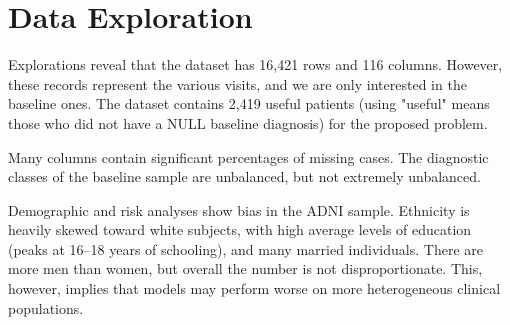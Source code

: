 \section{Data Exploration}
Explorations reveal that the dataset has 16,421 rows and 116 columns. However, these records represent the various visits, and we are only interested in the baseline ones. The dataset contains 2,419 useful patients (using "useful" means those who did not have a NULL baseline diagnosis) for the proposed problem.

Many columns contain significant percentages of missing cases. The diagnostic classes of the baseline sample are unbalanced, but not extremely unbalanced.

Demographic and risk analyses show bias in the ADNI sample. Ethnicity is heavily skewed toward white subjects, with high average levels of education (peaks at 16–18 years of schooling), and many married individuals. There are more men than women, but overall the number is not disproportionate. This, however, implies that models may perform worse on more heterogeneous clinical populations. 




